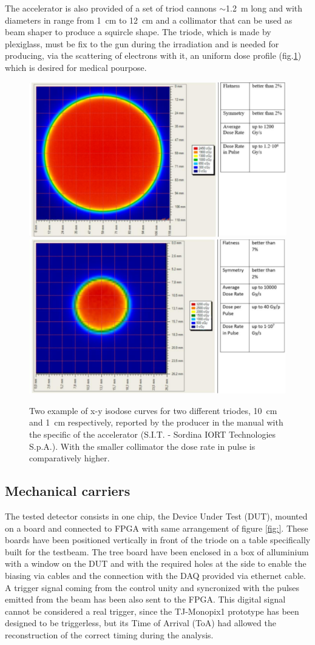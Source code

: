       The accelerator is also provided of a set of triod cannons $\sim$\SI{1.2}{m} long and with diameters in range from \SI{1}{cm} to \SI{12}{cm} and a collimator that can be used as beam shaper to produce a squircle shape.
      The triode, which is made by plexiglass, must be fix to the gun during the irradiation and is needed for producing,  via the scattering of electrons with it, an uniform dose profile (fig.\ref{fig:dose_profile}) which is desired for medical pourpose.
      \begin{figure}[h!]
         \centering
         \includegraphics[width=.49\linewidth]{figures/test_beam/dose_profile_10cm.pdf}
         \includegraphics[width=.49\linewidth]{figures/test_beam/dose_profile_1cm.pdf}
         \caption{Two example of x-y isodose curves for two different triodes, \SI{10}{cm} and \SI{1}{cm} respectively, reported by the producer in the manual with the specific of the accelerator (S.I.T. - Sordina IORT Technologies S.p.A.). With the smaller collimator the dose rate in pulse is comparatively higher.}
         \label{fig:dose_profile}
      \end{figure}  

   \subsection{Mechanical carriers}
      The tested detector consists in one chip, the Device Under Test (DUT), mounted on a board and connected to FPGA with same arrangement of figure \ref{fig:}.
      These boards have been positioned vertically in front of the triode on a table specifically built for the testbeam. The tree board have been enclosed in a box of alluminium with a window on the DUT and with the required holes at the side to enable the biasing via cables and the connection with the DAQ provided via ethernet cable.       
      A trigger signal coming from the control unity and syncronized with the pulses emitted from the beam has been also sent to the FPGA.
      This digital signal cannot be considered a real trigger, since the TJ-Monopix1 prototype has been designed to be triggerless, but its Time of Arrival (ToA) had allowed the reconstruction of the correct timing during the analysis.


